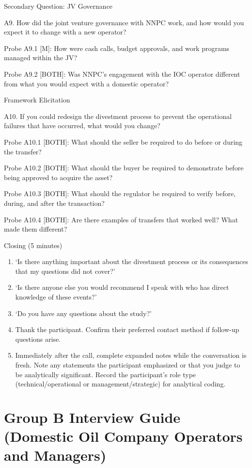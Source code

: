 Secondary Question: JV Governance

A9. How did the joint venture governance with NNPC work, and how would
you expect it to change with a new operator?

Probe A9.1 {[}M{]}: How were cash calls, budget approvals, and work
programs managed within the JV?

Probe A9.2 {[}BOTH{]}: Was NNPC's engagement with the IOC operator
different from what you would expect with a domestic operator?

Framework Elicitation

A10. If you could redesign the divestment process to prevent the
operational failures that have occurred, what would you change?

Probe A10.1 {[}BOTH{]}: What should the seller be required to do before
or during the transfer?

Probe A10.2 {[}BOTH{]}: What should the buyer be required to demonstrate
before being approved to acquire the asset?

Probe A10.3 {[}BOTH{]}: What should the regulator be required to verify
before, during, and after the transaction?

Probe A10.4 {[}BOTH{]}: Are there examples of transfers that worked
well? What made them different?

Closing (5 minutes)

\begin{enumerate}
\def\labelenumi{\arabic{enumi}.}
\item
  `Is there anything important about the divestment process or its
  consequences that my questions did not cover?'
\item
  `Is there anyone else you would recommend I speak with who has direct
  knowledge of these events?'
\item
  `Do you have any questions about the study?'
\item
  Thank the participant. Confirm their preferred contact method if
  follow-up questions arise.
\item
  Immediately after the call, complete expanded notes while the
  conversation is fresh. Note any statements the participant emphasized
  or that you judge to be analytically significant. Record the
  participant's role type (technical/operational or
  management/strategic) for analytical coding.
\end{enumerate}

\hypertarget{group-b-interview-guide-domestic-oil-company-operators-and-managers}{%
\section{Group B Interview Guide (Domestic Oil Company Operators and
Managers)}\label{group-b-interview-guide-domestic-oil-company-operators-and-managers}}

